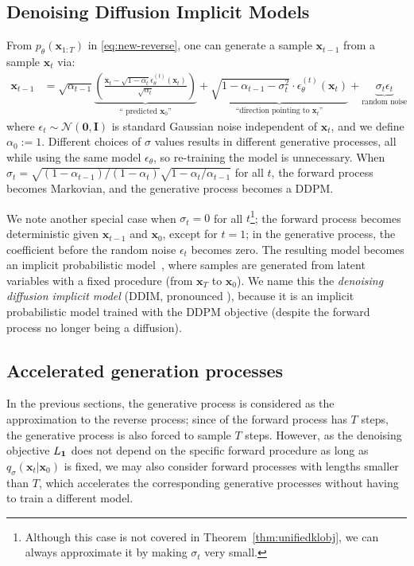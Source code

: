 \subsection{Denoising Diffusion Implicit Models}
\label{sec:reverse-family}
From $p_\theta(\bm{x}_{1:T})$ in \eqref{eq:new-reverse}, one can generate a sample $\bm{x}_{t-1}$ from a sample $\bm{x}_{t}$ via:
\begin{align}
    \bm{x}_{t-1} & = \sqrt{\alpha_{t-1}} \underbrace{\left(\frac{\bm{x}_t - \sqrt{1 - \alpha_t} \epsilon_\theta^{(t)}(\bm{x}_t)}{\sqrt{\alpha_t}}\right)}_{\text{`` predicted } \bm{x}_0 \text{''}} + \underbrace{\sqrt{1 - \alpha_{t-1} - \sigma_t^2} \cdot \epsilon_\theta^{(t)}(\bm{x}_t)}_{\text{``direction pointing to } \bm{x}_t \text{''}} + \underbrace{\sigma_t \epsilon_t}_{\text{random noise}} \label{eq:sample-eq-gen}
\end{align}
where $\epsilon_t \sim \mathcal{N}(\bm{0}, \bm{I})$ is standard Gaussian noise independent of $\bm{x}_t$, and we define $\alpha_0 := 1$. Different choices of $\sigma$ values results in different generative processes, all while using the same model $\epsilon_\theta$, so re-training the model is unnecessary. When $\sigma_t = \sqrt{(1 - \alpha_{t-1}) / (1 - \alpha_t)} \sqrt{1 - \alpha_t / \alpha_{t-1}}$ for all $t$, the forward process becomes Markovian, and the generative process becomes a DDPM.

We note another special case when $\sigma_t = 0$ for all $t$\footnote{Although this case is not covered in Theorem~\ref{thm:unifiedklobj}, we can always approximate it by making $\sigma_t$ very small.}; the forward process becomes deterministic given $\bm{x}_{t-1}$ and $\bm{x}_0$, except for $t = 1$; in the generative process, the coefficient before the random noise $\epsilon_t$ becomes zero. %
The resulting model becomes an implicit probabilistic model~\citep{mohamed2016learning}, where samples are generated from latent variables with a fixed procedure (from $\bm{x}_T$ to $\bm{x}_0$). We name this the \textit{denoising diffusion implicit model} (DDIM, pronounced ), because it is an implicit probabilistic model trained with the DDPM objective (despite the forward process no longer being a diffusion). 





\subsection{Accelerated generation processes}
\label{sec:acceleration}
In the previous sections, the generative process is considered as the approximation to the reverse process; since of the forward process has $T$ steps, the generative process is also forced to sample $T$ steps. However, as the denoising objective $L_{\bm{1}}$ does not depend on the specific forward procedure as long as $q_\sigma(\bm{x}_{t} | \bm{x}_0)$ is fixed, we may also consider forward processes with lengths smaller than $T$, which accelerates the corresponding generative processes without having to train a different model.


